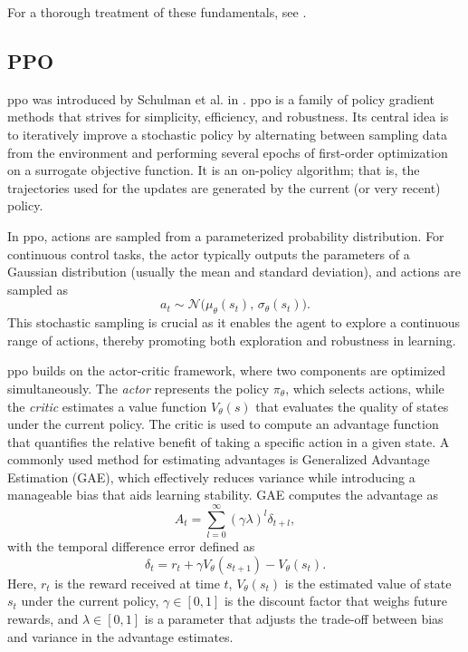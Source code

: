 For a thorough treatment of these fundamentals, see \cite{SuttonBarto2018}.



\subsection{PPO}
\gls{ppo} was introduced by Schulman et al. in \cite{schulman2017proximal}. \gls{ppo} is a family of policy gradient methods that strives for simplicity, efficiency, and robustness. Its central idea is to iteratively improve a stochastic policy by alternating between sampling data from the environment and performing several epochs of first-order optimization on a surrogate objective function. It is an on-policy algorithm; that is, the trajectories used for the updates are generated by the current (or very recent) policy.

In \gls{ppo}, actions are sampled from a parameterized probability distribution. For continuous control tasks, the actor typically outputs the parameters of a Gaussian distribution (usually the mean and standard deviation), and actions are sampled as 
\[
a_t \sim \mathcal{N}\big(\mu_\theta(s_t),\, \sigma_\theta(s_t)\big).
\]
This stochastic sampling is crucial as it enables the agent to explore a continuous range of actions, thereby promoting both exploration and robustness in learning.

\gls{ppo} builds on the actor-critic framework, where two components are optimized simultaneously. The \emph{actor} represents the policy \(\pi_\theta\), which selects actions, while the \emph{critic} estimates a value function \(V_\theta(s)\) that evaluates the quality of states under the current policy. The critic is used to compute an advantage function that quantifies the relative benefit of taking a specific action in a given state. A commonly used method for estimating advantages is Generalized Advantage Estimation (GAE), which effectively reduces variance while introducing a manageable bias that aids learning stability. GAE computes the advantage as
\[
\hat{A}_t = \sum_{l=0}^{\infty} (\gamma \lambda)^l \delta_{t+l},
\]
with the temporal difference error defined as
\[
\delta_t = r_t + \gamma V_\theta(s_{t+1}) - V_\theta(s_t).
\]
Here, \(r_t\) is the reward received at time \(t\), \(V_\theta(s_t)\) is the estimated value of state \(s_t\) under the current policy, \(\gamma \in [0,1]\) is the discount factor that weighs future rewards, and \(\lambda \in [0,1]\) is a parameter that adjusts the trade-off between bias and variance in the advantage estimates.


